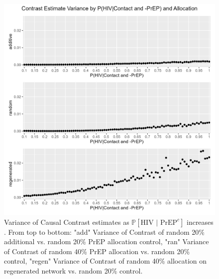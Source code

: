 \documentclass{article}
\theoremstyle{definition}
\begin{document}
\begin{figure}[H]
    \centering
    \includegraphics[scale=0.75]{Figures/p1 Variance plots.png}
    \caption{Variance of Causal Contrast estimates as $\mathbb{P}\left[\text{HIV } \vert \text{ PrEP}^{c}\right]$ increases .  From top to bottom: "add" Variance of Contrast of random 20\% additional vs. random 20\% PrEP allocation control, "ran" Variance of Contrast of random 40\% PrEP allocation vs. random 20\% control, "regen" Variance of Contrast of random 40\% allocation on regenerated network vs. random 20\% control.}
    \label{fig:Figure 14}
\end{figure}
\end{document}
